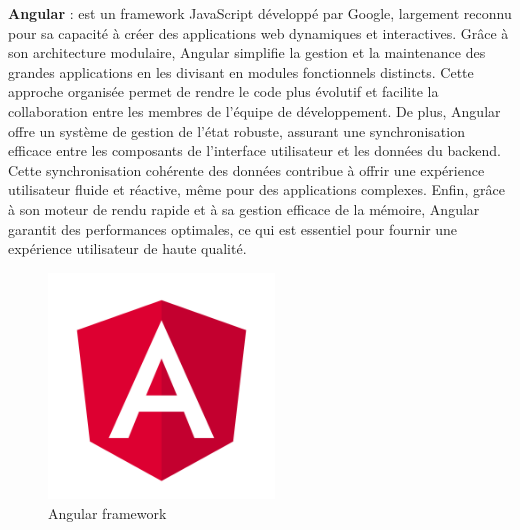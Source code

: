\textbf{Angular} : est un framework JavaScript développé par Google, largement reconnu pour sa capacité à créer des applications web dynamiques et interactives. Grâce à son architecture modulaire, Angular simplifie la gestion et la maintenance des grandes applications en les divisant en modules fonctionnels distincts. Cette approche organisée permet de rendre le code plus évolutif et facilite la collaboration entre les membres de l'équipe de développement. De plus, Angular offre un système de gestion de l'état robuste, assurant une synchronisation efficace entre les composants de l'interface utilisateur et les données du backend. Cette synchronisation cohérente des données contribue à offrir une expérience utilisateur fluide et réactive, même pour des applications complexes. Enfin, grâce à son moteur de rendu rapide et à sa gestion efficace de la mémoire, Angular garantit des performances optimales, ce qui est essentiel pour fournir une expérience utilisateur de haute qualité.
\\
\begin{figure}[H] 
    \centering
    \includegraphics[width=6cm]{Figures/angular.png}
    \caption{Angular framework}
\end{figure}



